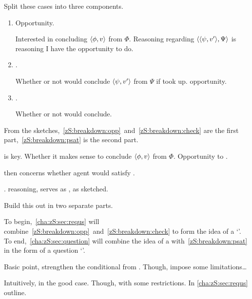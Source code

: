 \begin{note}
  Split these cases into three components.
  \begin{enumerate}[label=\Roman*., ref=(\Roman*)]
  \item
    \label{zS:breakdown:opp}
    Opportunity.

    Interested in concluding \(\langle \phi, v \rangle\) from \(\Phi\).
    Reasoning regarding \(\langle \langle \psi, v' \rangle, \Psi \rangle\) is reasoning I have the opportunity to do.
  \item
    \label{zS:breakdown:check}
    .

    Whether or not would conclude \(\langle \psi, v' \rangle\) from \(\Psi\) if took up. opportunity.
  \item
    \label{zS:breakdown:psat}
    .

    Whether or not would conclude.
  \end{enumerate}

  From the sketches,~\ref{zS:breakdown:opp}~and~\ref{zS:breakdown:check} are the first part,~\ref{zS:breakdown:psat} is the second part.

   is key.
  Whether it makes sense to conclude \(\langle \phi, v \rangle\) from \(\Phi\).
  Opportunity to .

   then concerns whether agent would satisfy .

  .
  \collateral{} reasoning, serves as , as sketched.
\end{note}

\begin{note}
  Build this out in two separate parts.

  To begin,~\autoref{cha:zS:sec:requs} will combine~\ref{zS:breakdown:opp}~and~\ref{zS:breakdown:check} to form the idea of a `\requ{}'.
  To end,~\ref{cha:zS:sec:question} will combine the idea of a \requ{} with~\ref{zS:breakdown:psat} in the form of a question `\qzS{}'.
\end{note}

\begin{note}
  Basic point, strengthen the conditional from .
  Though, impose some limitations\dots

  Intuitively, \fc{} in the good case.
  Though, with some restrictions.
  In \autoref{cha:zS:sec:requs} outline.
\end{note}

\section{}
\label{cha:zS:sec:requs}

